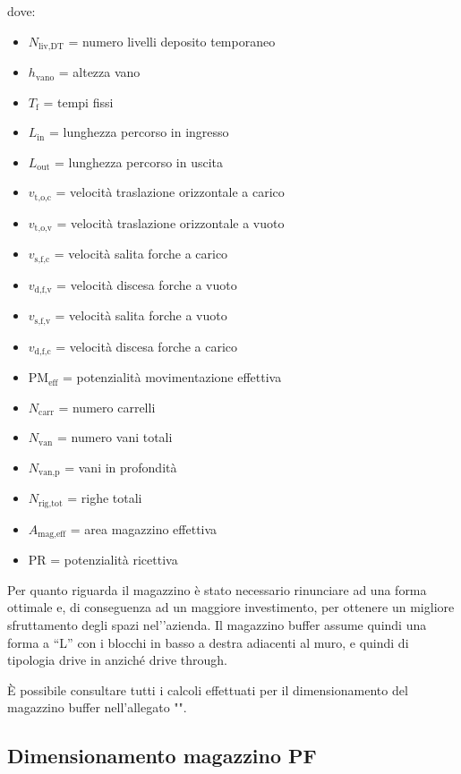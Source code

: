 \documentclass[11pt]{article}
\begin{document}
dove:
\begin{itemize}
    \item $N_{\text{liv,DT}}$ = numero livelli deposito temporaneo
    \item $h_{\text{vano}}$ = altezza vano
    \item $T_{\text{f}}$ = tempi fissi
    \item $L_{\text{in}}$ = lunghezza percorso in ingresso
    \item $L_{\text{out}}$ = lunghezza percorso in uscita
    \item $v_{\text{t,o,c}}$ = velocità traslazione orizzontale a carico
    \item $v_{\text{t,o,v}}$ = velocità traslazione orizzontale a vuoto
    \item $v_{\text{s,f,c}}$ = velocità salita forche a carico
    \item $v_{\text{d,f,v}}$ = velocità discesa forche a vuoto
    \item $v_{\text{s,f,v}}$ = velocità salita forche a vuoto
    \item $v_{\text{d,f,c}}$ = velocità discesa forche a carico
    \item $\text{PM}_{\text{eff}}$ = potenzialità movimentazione effettiva
    \item $N_{\text{carr}}$ = numero carrelli
    \item $N_{\text{van}}$ = numero vani totali
    \item $N_{\text{van,p}}$ = vani in profondità
    \item $N_{\text{rig,tot}}$ = righe totali
    \item $A_{\text{mag,eff}}$ = area magazzino effettiva
    \item $\text{PR}$ = potenzialità ricettiva
\end{itemize}

\newpage
Per quanto riguarda il magazzino è stato necessario rinunciare ad una forma ottimale e, di conseguenza ad un maggiore investimento, per ottenere un migliore sfruttamento degli spazi nel'’azienda. Il magazzino buffer assume quindi una forma a “L” con i blocchi in basso a destra adiacenti al muro, e quindi di tipologia drive in anziché drive through.

È possibile consultare tutti i calcoli effettuati per il dimensionamento del magazzino buffer nell'allegato "".
\newpage

\subsection{Dimensionamento magazzino PF}
\end{document}
